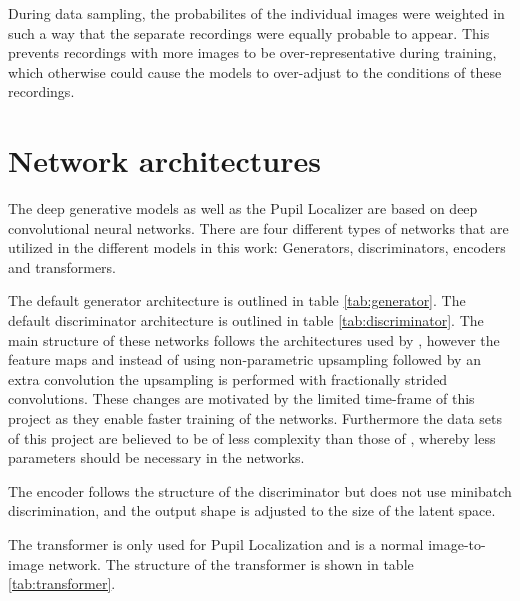 During data sampling, the probabilites of the individual images were weighted in such a way that the separate recordings were equally probable to appear. This prevents recordings with more images to be over-representative during training, which otherwise could cause the models to over-adjust to the conditions of these recordings.

\section{Network architectures}
The deep generative models as well as the Pupil Localizer are based on deep convolutional neural networks. There are four different types of networks that are utilized in the different models in this work: Generators, discriminators, encoders and transformers. 

The default generator architecture is outlined in table \ref{tab:generator}. The default discriminator architecture is outlined in table \ref{tab:discriminator}. The main structure of these networks follows the architectures used by \textcite{karras2017progressive}, however the feature maps and instead of using non-parametric upsampling followed by an extra convolution the upsampling is performed with fractionally strided convolutions. These changes are motivated by the limited time-frame of this project as they enable faster training of the networks. Furthermore the data sets of this project are believed to be of less complexity than those of \textcite{karras2017progressive}, whereby less parameters should be necessary in the networks.

The encoder follows the structure of the discriminator but does not use minibatch discrimination, and the output shape is adjusted to the size of the latent space. 

The transformer is only used for Pupil Localization and is a normal image-to-image network. The structure of the transformer is shown in table \ref{tab:transformer}.


